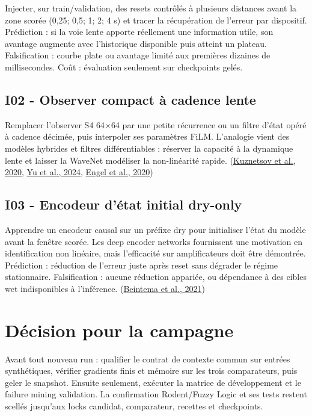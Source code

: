 \documentclass[10pt,a4paper]{article}
\begin{document}
Injecter, sur train/validation, des resets contr\^{o}l\'{e}s \`{a} plusieurs distances avant
la zone scor\'{e}e (0,25; 0,5; 1; 2; 4 s) et tracer la r\'{e}cup\'{e}ration de l'erreur par
dispositif. Pr\'{e}diction : si la voie lente apporte r\'{e}ellement une information
utile, son avantage augmente avec l'historique disponible puis atteint un
plateau. Falsification : courbe plate ou avantage limit\'{e} aux premi\`{e}res dizaines
de millisecondes. Co\^{u}t : \'{e}valuation seulement sur checkpoints gel\'{e}s.

\subsection{I02 - Observer compact \`{a} cadence lente}

Remplacer l'observer S4 64×64 par une petite r\'{e}currence ou un filtre d'\'{e}tat op\'{e}r\'{e}
\`{a} cadence d\'{e}cim\'{e}e, puis interpoler ses param\`{e}tres FiLM. L'analogie vient des
mod\`{e}les hybrides et filtres diff\'{e}rentiables : r\'{e}server la capacit\'{e} \`{a} la dynamique
lente et laisser la WaveNet mod\'{e}liser la non-lin\'{e}arit\'{e} rapide.
(\href{https://www.dafx.de/paper-archive/details/rA_6fTdLky8YDvH03jdufw}{Kuznetsov et al., 2020},
\href{https://arxiv.org/abs/2404.07970}{Yu et al., 2024},
\href{https://arxiv.org/abs/2001.04643}{Engel et al., 2020})

\subsection{I03 - Encodeur d'\'{e}tat initial dry-only}

Apprendre un encodeur causal sur un pr\'{e}fixe dry pour initialiser l'\'{e}tat du mod\`{e}le
avant la fen\^{e}tre scor\'{e}e. Les deep encoder networks fournissent une motivation en
identification non lin\'{e}aire, mais l'efficacit\'{e} sur amplificateurs doit \^{e}tre
d\'{e}montr\'{e}e. Pr\'{e}diction : r\'{e}duction de l'erreur juste apr\`{e}s reset sans d\'{e}grader le
r\'{e}gime stationnaire. Falsification : aucune r\'{e}duction appari\'{e}e, ou d\'{e}pendance \`{a}
des cibles wet indisponibles \`{a} l'inf\'{e}rence.
(\href{https://proceedings.mlr.press/v144/beintema21a.html}{Beintema et al., 2021})

\section{D\'{e}cision pour la campagne}

Avant tout nouveau run : qualifier le contrat de contexte commun sur entr\'{e}es
synth\'{e}tiques, v\'{e}rifier gradients finis et m\'{e}moire sur les trois comparateurs,
puis geler le snapshot. Ensuite seulement, ex\'{e}cuter la matrice de d\'{e}veloppement
et le failure mining validation. La confirmation Rodent/Fuzzy Logic et ses tests
restent scell\'{e}s jusqu'aux locks candidat, comparateur, recettes et checkpoints.
\end{document}
